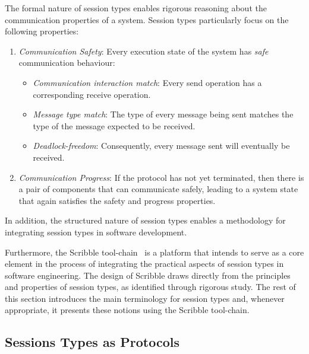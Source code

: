The formal nature of session types enables rigorous
reasoning about the communication properties of a system.
Session types particularly focus on the following properties:
%
\begin{enumerate}[label=$\bullet$]
	\item	{\em Communication Safety}: Every execution state of the system has {\em safe} communication behaviour:
	\begin{itemize}
		\item	{\em Communication interaction match}:
				Every send
				operation has a corresponding receive
				operation.
		\item	{\em Message type match}:
				The type of every message being sent matches the type of the message expected to be received.
		\item	{\em Deadlock-freedom}:
				Consequently, every message sent will eventually be received.
	\end{itemize}

	\item	{\em Communication Progress}: If the protocol has not yet terminated, then there is a pair of components that can communicate safely, leading to a system state that again satisfies the safety and progress properties.
\end{enumerate}
%
In addition, the structured nature of session types enables
a methodology for integrating session types in software development.


Furthermore, the Scribble tool-chain~\cite{scribble} is a platform
that intends to serve as a core element in the process
of integrating the practical aspects of session types
in software engineering. The design of Scribble
draws directly from the principles and properties of session types,
as identified through rigorous study. The rest of this
section introduces the main terminology for session types
and, whenever appropriate, it presents these notions
using the Scribble tool-chain.

\subsection{Sessions Types as Protocols}%
\label{sec:sessions_scribble}

